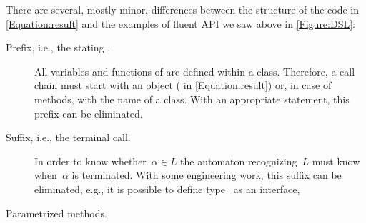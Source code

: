 There are several, mostly minor, differences between the structure of the \Java code
  in \cref{Equation:result}
  and the examples of fluent API we saw above in \cref{Figure:DSL}:
\begin{description}
  \item[Prefix, i.e., the stating .]
    All variables and functions of \Java are defined within a class.
    Therefore, a call chain must start with an object ( in \cref{Equation:result})
      or, in case of  methods, with the name of a class.
    With an appropriate  statement, this prefix can be eliminated.
  \item[Suffix, i.e., the terminal  call.]
    In order to know whether~$α∈L$ the automaton recognizing~$L$ must
      know when~$α$ is terminated.
    With some engineering work, this suffix can be eliminated, e.g., it is possible to define
      type~ as an interface,
  \item[Parametrized methods.]
\end{description}
